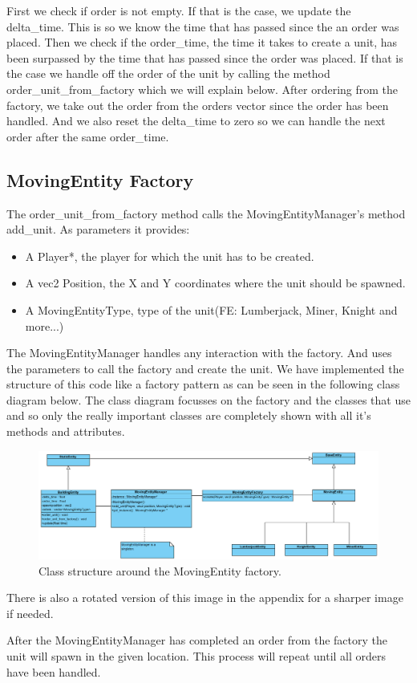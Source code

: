 First we check if order is not empty. If that is the case, we update the delta\_time. This is so we know the time that has passed since the an order was placed. Then we check if the order\_time, the time it takes to create a unit, has been surpassed by the time that has passed since the order was placed. If that is the case we handle off the order of the unit by calling the method order\_unit\_from\_factory which we will explain below. After ordering from the factory, we take out the order from the orders vector since the order has been handled. And we also reset the delta\_time to zero so we can handle the next order after the same order\_time.

\subsection{MovingEntity Factory}
The order\_unit\_from\_factory method calls the MovingEntityManager's method add\_unit. As parameters it provides:

\begin{itemize}  
\item A Player*, the player for which the unit has to be created.
\item A vec2 Position, the X and Y coordinates where the unit should be spawned.
\item A MovingEntityType, type of the unit(FE: Lumberjack, Miner, Knight and more...)
\end{itemize}
The MovingEntityManager handles any interaction with the factory. And uses the parameters to call the factory and create the unit. We have implemented the structure of this code like a factory pattern as can be seen in the following class diagram below. The class diagram focusses on the factory and the classes that use and so only the really important classes are completely shown with all it's methods and attributes.  
\begin{figure}[!htb]
    \centering
    \includegraphics[scale=0.55]{res/MovingEntityFactoryClass.png}
    \caption{Class structure around the MovingEntity factory.}
\end{figure}
\newpage
 
There is also a rotated version of this image in the appendix for a sharper image if needed.

After the MovingEntityManager has completed an order from the factory the unit will spawn in the given location. This process will repeat until all orders have been handled.





